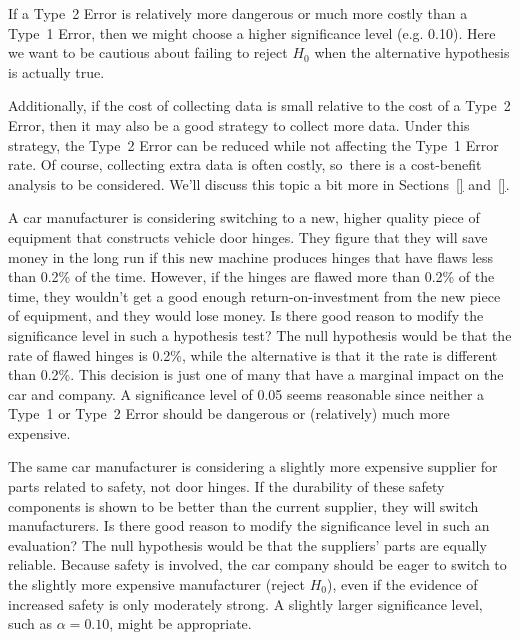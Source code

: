 If a Type~2 Error is relatively more dangerous or much more
costly than a Type~1 Error, then we might choose a higher
significance level (e.g. 0.10). Here we want to be cautious
about failing to reject $H_0$ when the alternative hypothesis
is actually true.

Additionally, if the cost of collecting data is small relative
to the cost of a Type~2 Error, then it may also be a good
strategy to collect more data.
Under this strategy, the Type~2 Error can be reduced
while not affecting the Type~1 Error rate.
Of course, collecting extra data is often costly,
so~there is a cost-benefit analysis to be considered.
We'll discuss this topic a bit more in
Sections~\ref{} and~\ref{}.

\newcommand{\doorhingeflawrate}{0.2}

\begin{examplewrap}
\begin{nexample}{A car manufacturer is considering switching
    to a new, higher quality piece of equipment that constructs
    vehicle door hinges.
    They figure that they will save money in the long run
    if this new machine produces hinges
    that have flaws less than
    \doorhingeflawrate{}\% of the time.
    However, if the hinges are flawed more than
    \doorhingeflawrate{}\% of
    the time, they wouldn't get a good enough
    return-on-investment from the new piece of equipment,
    and they would lose money.
    Is there good reason to modify the significance level
    in such a hypothesis test?}
  The null hypothesis would be that the rate of flawed
  hinges is \doorhingeflawrate{}\%,
  while the alternative is that it the rate
  is different than \doorhingeflawrate{}\%.
  This decision is just one of many that have a marginal
  impact on the car and company.
  A significance level of 0.05 seems reasonable since
  neither a Type~1 or Type~2 Error should be dangerous
  or (relatively) much more expensive.
\end{nexample}
\end{examplewrap}

\begin{examplewrap}
\begin{nexample}{The same car manufacturer is considering
    a slightly more expensive supplier for parts related
    to safety, not door hinges.
    If the durability of these
    safety components is shown to be better than the
    current supplier, they will switch manufacturers.
    Is there good reason to modify the significance level
    in such an evaluation?}
  The null hypothesis would be that the suppliers' parts
  are equally reliable. Because safety is involved,
  the car company should be eager to switch to the slightly
  more expensive manufacturer (reject $H_0$), even if the
  evidence of increased safety is only moderately strong.
  A slightly larger significance level,
  such as $\alpha=0.10$, might be appropriate.
\end{nexample}
\end{examplewrap}

